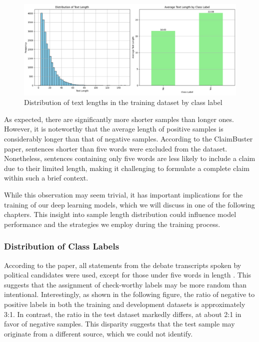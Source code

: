 \begin{figure}[h]
    \centering
    \includegraphics[width=1\textwidth]{assets/Text_Length_with_Barplot.jpg}
    \caption{Distribution of text lengths in the training dataset by class label}
    \label{fig:my_length_barplot}
\end{figure}


As expected, there are significantly more shorter samples than longer ones. However, it is noteworthy that the average length of positive samples is considerably longer than that of negative samples. According to the ClaimBuster paper, sentences shorter than five words were excluded from the dataset. Nonetheless, sentences containing only five words are less likely to include a claim due to their limited length, making it challenging to formulate a complete claim within such a brief context.

While this observation may seem trivial, it has important implications for the training of our deep learning models, which we will discuss in one of the following chapters. This insight into sample length distribution could influence model performance and the strategies we employ during the training process.


\subsubsection{Distribution of Class Labels} \label{dist_labels}
According to the paper, all statements from the debate transcripts spoken by political candidates were used, except for those under five words in length \cite{claimbuster_arslan}. This suggests that the assignment of check-worthy labels may be more random than intentional. Interestingly, as shown in the following figure, the ratio of negative to positive labels in both the training and development datasets is approximately 3:1. In contrast, the ratio in the test dataset markedly differs, at about 2:1 in favor of negative samples. This disparity suggests that the test sample may originate from a different source, which we could not identify.


